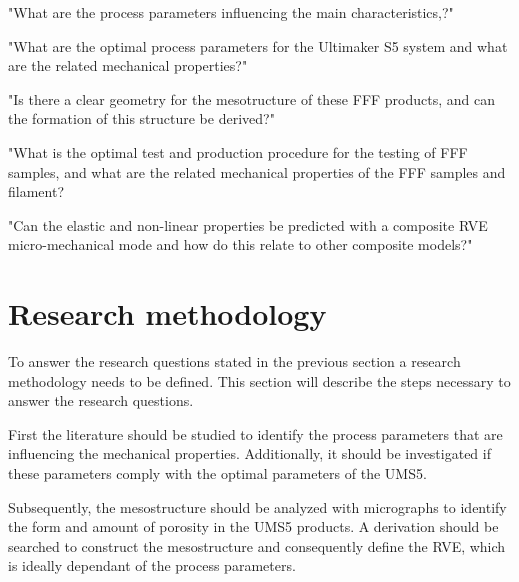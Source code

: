 "What are the process parameters influencing the main characteristics,?"

"What are the optimal process parameters for the Ultimaker S5 system and what are the related mechanical properties?"

"Is there a clear geometry for the mesotructure of these FFF products, and can the formation of this structure be derived?"

"What is the optimal test and production procedure for the testing of FFF samples, and what are the related mechanical properties of the FFF samples and filament?

"Can the elastic and non-linear properties be predicted with a composite RVE micro-mechanical mode and how do this relate to other composite models?"






\section{Research methodology}
To answer the research questions stated in the previous section a research methodology needs to be defined. This section will describe the steps necessary to answer the research questions. 

First the literature should be studied to identify the process parameters that are influencing the mechanical properties. Additionally, it should be investigated if these parameters comply with the optimal parameters of the UMS5.

Subsequently, the mesostructure should be analyzed with micrographs to identify the form and amount of porosity in the UMS5 products.  A derivation should be searched to construct the mesostructure and consequently define the RVE, which is ideally dependant of the process parameters. 

